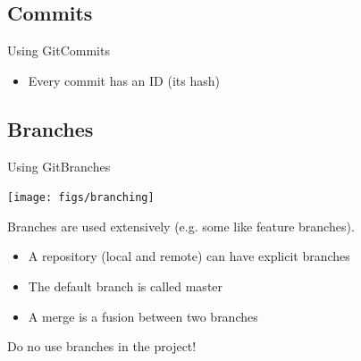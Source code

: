 \documentclass[10pt,compress]{beamer} %
\begin{document}


\subsection{Commits}
\begin{frame}{Using Git}{Commits}

\begin{itemize}
\item Every commit has an ID (its hash)
\end{itemize}

\end{frame}

\subsection{Branches}
\begin{frame}{Using Git}{Branches}

\centering \texttt{[image: figs/branching]}

\flushleft Branches are used extensively (e.g. some like feature branches).

\begin{itemize}
 \item A repository (local and remote) can have explicit branches
 \item The default branch is called \alert{master}
 \item A \alert{merge} is a fusion between two branches
\end{itemize}

Do no use branches in the project!

\end{frame}
\end{document}
